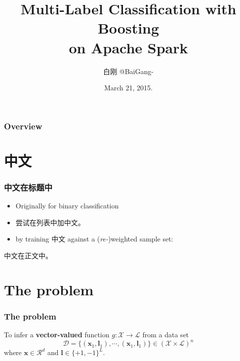 \documentclass{beamer}
\title[MultiBoost]{Multi-Label Classification with Boosting \\ on Apache Spark}
\author{
白刚  @BaiGang-
} %
\institute[Sina] %
{
\textit{Sina Ad Algo}
}
\date{March 21, 2015.} %
\begin{document}
\begin{frame}
\titlepage %
\end{frame}

\begin{frame}
\frametitle{Overview} %
\tableofcontents %
\end{frame}

\section{中文}

\begin{frame}
\frametitle{中文在标题中} %
\begin{itemize}
\item Originally for binary classification
\item 尝试在列表中加中文。
\item by training 中文 against a (\textit{re-})weighted sample set:
\end{itemize}
中文在正文中。
\end{frame}




\section{The problem} 

\begin{frame}
\frametitle{The problem}
To infer a \textbf{vector-valued} function $g : \mathcal{X} \rightarrow \mathcal{L}$ from a data set
$$\mathcal{D} = \{({\mathbf{x}}_1, {\mathbf{l}}_1), \cdots, ({\mathbf{x}}_1, {\mathbf{l}}_1)\} \in (\mathcal{X} \times \mathcal{L})^n$$
where $\mathbf{x} \in \mathcal{R}^d$ and $\mathbf{l} \in {\{+1,-1\}}^L$.
\end{frame}
\end{document}
